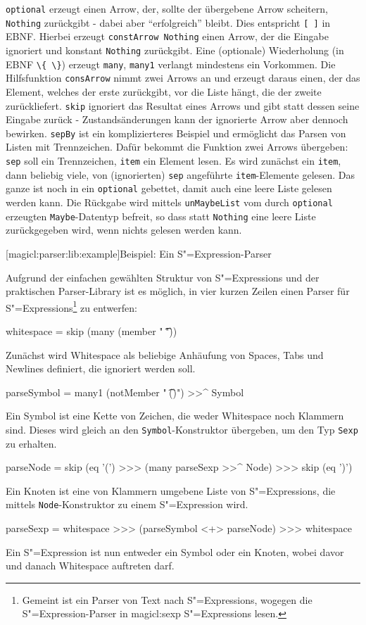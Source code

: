 \documentclass[a4paper, bibgerm]{book}
\newcommand\icode[1]{\lstinline?#1?}
\newcommand\lsubsubsection{}
\newcommand\sref{}
\newcommand{\sexp}{S"=Expression}
\newcommand{\sexps}{S"=Expressions}
\begin{document}
\icode{optional} erzeugt einen Arrow, der, sollte der übergebene Arrow
scheitern, \icode{Nothing} zurückgibt - dabei aber "`erfolgreich"'
bleibt. Dies entspricht \icode{[ ]} in EBNF. Hierbei erzeugt
\icode{constArrow Nothing} einen Arrow, der die Eingabe ignoriert und
konstant \icode{Nothing} zurückgibt. Eine (optionale) Wiederholung (in EBNF
\icode{\{ \}}) erzeugt \icode{many}, \icode{many1} verlangt mindestens
ein Vorkommen. Die Hilfsfunktion \icode{consArrow} nimmt zwei
Arrows an und erzeugt daraus einen, der das Element, welches der erste
zurückgibt, vor die Liste hängt, die der zweite zurückliefert.
\icode{skip} ignoriert das Resultat eines Arrows und gibt
statt dessen seine Eingabe zurück - Zustandsänderungen kann der
ignorierte Arrow aber dennoch bewirken. \icode{sepBy} ist ein
komplizierteres Beispiel und ermöglicht das Parsen von Listen mit
Trennzeichen. Dafür bekommt die Funktion zwei Arrows übergeben:
\icode{sep} soll ein Trennzeichen, \icode{item} ein Element lesen. Es
wird zunächst ein \icode{item}, dann beliebig viele, von (ignorierten)
\icode{sep} angeführte \icode{item}-Elemente gelesen. Das ganze ist noch
in ein \icode{optional} gebettet, damit auch eine leere Liste gelesen
werden kann. Die Rückgabe wird mittels \icode{unMaybeList} vom durch
\icode{optional} erzeugten \icode{Maybe}-Datentyp befreit, so dass statt
\icode{Nothing} eine leere Liste zurückgegeben wird, wenn nichts gelesen
werden kann.

\lsubsubsection[magicl:parser:lib:example]{Beispiel: Ein \sexp{}-Parser}

Aufgrund der einfachen gewählten Struktur von \sexps{} und der
praktischen Parser-Library ist es möglich, in vier kurzen Zeilen einen
Parser für \sexps{}\footnote{Gemeint ist ein Parser von Text nach
  \sexps{}, wogegen die \sexp{}-Parser in \sref{magicl:sexp} \sexps{}
  lesen.} zu entwerfen:

\begin{code}
whitespace = skip (many (member " \t\n"))
\end{code}
Zunächst wird Whitespace als beliebige Anhäufung von Spaces, Tabs und
Newlines definiert, die ignoriert werden soll.
\begin{code}
parseSymbol = many1 (notMember " \t\n()") >>^ Symbol
\end{code} %
Ein Symbol ist eine Kette von Zeichen, die weder Whitespace noch
Klammern sind. Dieses wird gleich an den \icode{Symbol}-Konstruktor
übergeben, um den Typ \icode{Sexp} zu erhalten.
\begin{code}
parseNode = skip (eq '(') >>> (many parseSexp >>^ Node) >>> skip (eq ')') 
\end{code} %
Ein Knoten ist eine von Klammern umgebene Liste von \sexps{}, die
mittels \icode{Node}-Konstruktor zu einem \sexp{} wird.
\begin{code}
parseSexp = whitespace >>> (parseSymbol <+> parseNode) >>> whitespace
\end{code} %
Ein \sexp{} ist nun entweder ein Symbol oder ein Knoten, wobei davor und
danach Whitespace auftreten darf.
\end{document}
